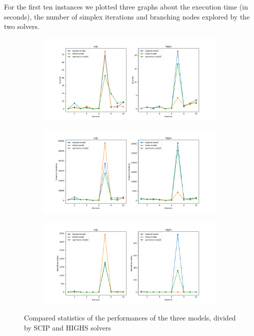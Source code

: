 For the first ten instances we plotted three graphs about the execution time (in seconds), the number of simplex iterations and branching nodes explored by the two solvers.
\begin{figure}[H]
    \centering
    \begin{subfigure}{0.3\linewidth}
        \includegraphics[width=\textwidth]{img/mip/execution_time_2.png}
    \end{subfigure}
    \begin{subfigure}{0.3\linewidth}
        \includegraphics[width=\textwidth]{img/mip/simplex_iterations_2.png}
    \end{subfigure}
    \begin{subfigure}{0.3\linewidth}
        \includegraphics[width=\textwidth]{img/mip/Figure_2.png}
    \end{subfigure}
    \caption{Compared statistics of the performances of the three models, divided by SCIP and HIGHS solvers}
\end{figure}

